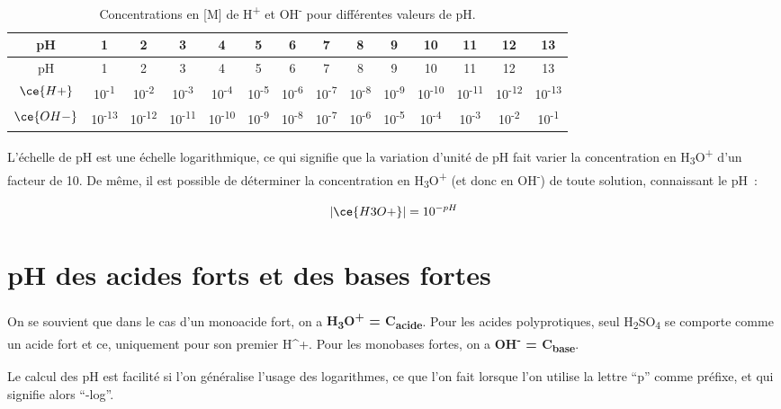 \documentclass[
  11pt,
  french,
  a4paper,
  openany]{book}
\begin{document}
\begin{longtable}[]{@{}cccccccccccccc@{}}
\caption{\label{tab:echelle-pH-1} Concentrations en {[}M{]} de H\textsuperscript{+} et OH\textsuperscript{-} pour différentes valeurs de pH.}\tabularnewline
\toprule
pH & 1 & 2 & 3 & 4 & 5 & 6 & 7 & 8 & 9 & 10 & 11 & 12 & 13\tabularnewline
\midrule
\endfirsthead
\toprule
pH & 1 & 2 & 3 & 4 & 5 & 6 & 7 & 8 & 9 & 10 & 11 & 12 & 13\tabularnewline
\midrule
\endhead
\(\ce{H+}\) & 10\textsuperscript{-1} & 10\textsuperscript{-2} & 10\textsuperscript{-3} & 10\textsuperscript{-4} & 10\textsuperscript{-5} & 10\textsuperscript{-6} & 10\textsuperscript{-7} & 10\textsuperscript{-8} & 10\textsuperscript{-9} & 10\textsuperscript{-10} & 10\textsuperscript{-11} & 10\textsuperscript{-12} & 10\textsuperscript{-13}\tabularnewline
\(\ce{OH-}\) & 10\textsuperscript{-13} & 10\textsuperscript{-12} & 10\textsuperscript{-11} & 10\textsuperscript{-10} & 10\textsuperscript{-9} & 10\textsuperscript{-8} & 10\textsuperscript{-7} & 10\textsuperscript{-6} & 10\textsuperscript{-5} & 10\textsuperscript{-4} & 10\textsuperscript{-3} & 10\textsuperscript{-2} & 10\textsuperscript{-1}\tabularnewline
\bottomrule
\end{longtable}

L'échelle de pH est une échelle logarithmique, ce qui signifie que la variation d'unité de pH fait varier la concentration en H\textsubscript{3}O\textsuperscript{+} d'un facteur de 10. De même, il est possible de déterminer la concentration en H\textsubscript{3}O\textsuperscript{+} (et donc en OH\textsuperscript{-}) de toute solution, connaissant le pH~:

\[
|\ce{H3O+}| = 10^{-pH}
\]

\clearpage

\hypertarget{ph-des-acides-forts-et-des-bases-fortes}{%
\section{pH des acides forts et des bases fortes}\label{ph-des-acides-forts-et-des-bases-fortes}}

On se souvient que dans le cas d'un monoacide fort, on a \textbf{\textbar H\textsubscript{3}O\textsuperscript{+}\textbar{} = C\textsubscript{acide}}. Pour les acides polyprotiques, seul H\textsubscript{2}SO\textsubscript{4} se comporte comme un acide fort et ce, uniquement pour son premier H\^{}+. Pour les monobases fortes, on a \textbf{\textbar OH\textsuperscript{-}\textbar{} = C\textsubscript{base}}.

Le calcul des pH est facilité si l'on généralise l'usage des logarithmes, ce que l'on fait lorsque l'on utilise la lettre ``p'' comme préfixe, et qui signifie alors ``-log''.
\end{document}
